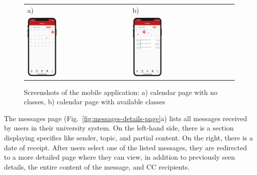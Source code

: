 \begin{figure}[htb]
    \centering
    \begin{tabular}{@{}ll@{}}
        a) & b) \\
        {\includegraphics[page=1,width=0.300\textwidth]{fig06/calendar_page_no_classes.png}} &
        {\includegraphics[page=7,width=0.300\textwidth]{fig06/calendar_page_with_classes.png}} \\
    \end{tabular}
    \caption{Screenshots of the mobile application: a) calendar page with no classes, b) calendar page with available classes} \label{fig:calendar-page}
\end{figure}

The messages page (Fig.~\ref{fig:messages-details-page}a) lists all messages received by users in their university system. On the left-hand side, there is a section displaying specifics like sender, topic, and partial content. On the right, there is a date of receipt. After users select one of the listed messages, they are redirected to a more detailed page where they can view, in addition to previously seen details, the entire content of the message, and CC recipients.

